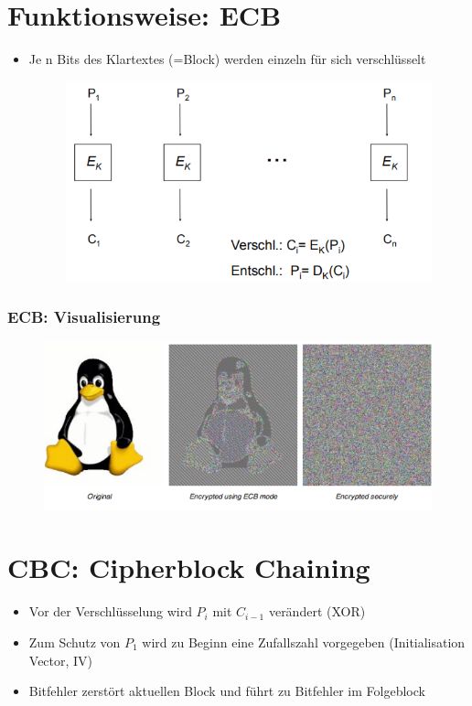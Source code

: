 \documentclass[openany]{book}
\begin{document}
\newpage

\section{Funktionsweise: ECB}

\begin{itemize}
    \item Je n Bits des Klartextes (=Block) werden einzeln für sich verschlüsselt
    \begin{figure}[h!]
        \centering
        \includegraphics[width=0.75\linewidth]{Pics/ECB.PNG}
    \end{figure}
\end{itemize}

\subsubsection{ECB: Visualisierung}

\begin{figure}[h!]
    \centering
    \includegraphics[width=0.75\linewidth]{Pics/ECB2.PNG}
\end{figure}

\section{CBC: Cipherblock Chaining}

\begin{itemize}
    \item Vor der Verschlüsselung wird $P_i$ mit $C_{i-1}$ verändert (XOR)
    \item Zum Schutz von $P_1$ wird zu Beginn eine Zufallszahl vorgegeben (Initialisation Vector, IV)
    \item Bitfehler zerstört aktuellen Block und führt zu Bitfehler im Folgeblock
\end{itemize}
\end{document}
